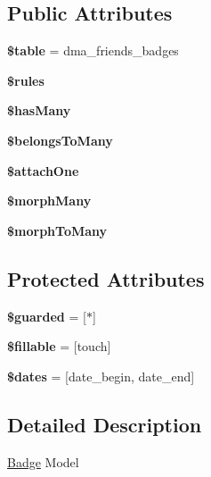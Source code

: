 \subsection*{Public Attributes}
\begin{DoxyCompactItemize}
\item 
\hypertarget{classDMA_1_1Friends_1_1Models_1_1Badge_aa58560300753d15561b1a979aa21b8fd}{}{\bfseries \$table} = \textquotesingle{}dma\+\_\+friends\+\_\+badges\textquotesingle{}\label{classDMA_1_1Friends_1_1Models_1_1Badge_aa58560300753d15561b1a979aa21b8fd}

\item 
{\bfseries \$rules}
\item 
{\bfseries \$has\+Many}
\item 
{\bfseries \$belongs\+To\+Many}
\item 
{\bfseries \$attach\+One}
\item 
{\bfseries \$morph\+Many}
\item 
{\bfseries \$morph\+To\+Many}
\end{DoxyCompactItemize}
\subsection*{Protected Attributes}
\begin{DoxyCompactItemize}
\item 
\hypertarget{classDMA_1_1Friends_1_1Models_1_1Badge_ae0b360f20ce06a26af28c91de3f63e11}{}{\bfseries \$guarded} = \mbox{[}\textquotesingle{}$\ast$\textquotesingle{}\mbox{]}\label{classDMA_1_1Friends_1_1Models_1_1Badge_ae0b360f20ce06a26af28c91de3f63e11}

\item 
\hypertarget{classDMA_1_1Friends_1_1Models_1_1Badge_a4d4f326e6071e6d44fdb54d93d579c44}{}{\bfseries \$fillable} = \mbox{[}\textquotesingle{}touch\textquotesingle{}\mbox{]}\label{classDMA_1_1Friends_1_1Models_1_1Badge_a4d4f326e6071e6d44fdb54d93d579c44}

\item 
\hypertarget{classDMA_1_1Friends_1_1Models_1_1Badge_ae8aa2206bbd9a6e152db7691a0dfd0b5}{}{\bfseries \$dates} = \mbox{[}\textquotesingle{}date\+\_\+begin\textquotesingle{}, \textquotesingle{}date\+\_\+end\textquotesingle{}\mbox{]}\label{classDMA_1_1Friends_1_1Models_1_1Badge_ae8aa2206bbd9a6e152db7691a0dfd0b5}

\end{DoxyCompactItemize}


\subsection{Detailed Description}
\hyperlink{classDMA_1_1Friends_1_1Models_1_1Badge}{Badge} Model 

